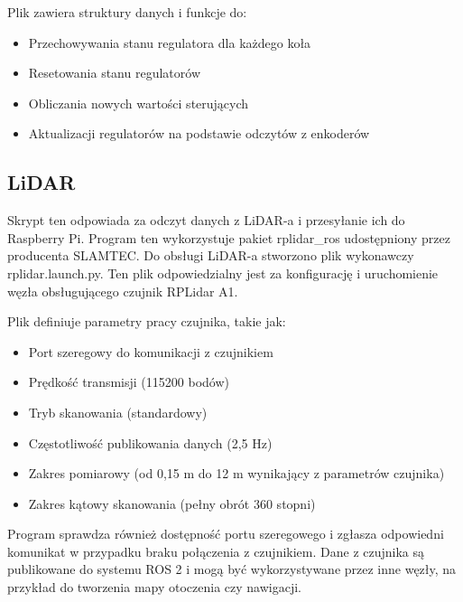 \documentclass[a4paper,twoside,12pt]{book}
\begin{document}
\begin{itemize}
			Plik zawiera struktury danych i funkcje do:
			\begin{itemize}
				\item Przechowywania stanu regulatora dla każdego koła
				\item Resetowania stanu regulatorów
				\item Obliczania nowych wartości sterujących
				\item Aktualizacji regulatorów na podstawie odczytów z enkoderów
			\end{itemize}
			
\end{itemize}
 
\newpage
\subsection{LiDAR}
Skrypt ten odpowiada za odczyt danych z LiDAR-a i przesyłanie ich do Raspberry Pi. Program ten wykorzystuje pakiet rplidar\_ros udostępniony przez producenta SLAMTEC. 
Do obsługi LiDAR-a stworzono plik wykonawczy rplidar.launch.py. Ten plik odpowiedzialny jest za konfigurację i uruchomienie węzła obsługującego czujnik RPLidar A1. 


Plik definiuje parametry pracy czujnika, takie jak:
\begin{itemize}
\item Port szeregowy do komunikacji z czujnikiem
\item Prędkość transmisji (115200 bodów)
\item Tryb skanowania (standardowy)
\item Częstotliwość publikowania danych (2,5 Hz)
\item Zakres pomiarowy (od 0,15 m do 12 m wynikający z parametrów czujnika)
\item Zakres kątowy skanowania (pełny obrót 360 stopni)
\end{itemize}

Program sprawdza również dostępność portu szeregowego i zgłasza odpowiedni komunikat w przypadku braku połączenia z czujnikiem. Dane z czujnika są publikowane do systemu ROS 2 i mogą być wykorzystywane przez inne węzły, na przykład do tworzenia mapy otoczenia czy nawigacji.
\end{document}
